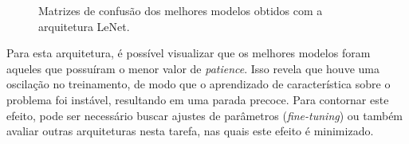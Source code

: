 \begin{figure}[h!]
	\centering
	\caption{Matrizes de confusão dos melhores modelos obtidos com a arquitetura LeNet.}\label{fig:matrizes-lenet}
	\hfill
\end{figure}



Para esta arquitetura, é possível visualizar que os melhores modelos foram aqueles que possuíram o menor valor de \emph{patience}. Isso revela que houve uma oscilação no treinamento, de modo que o aprendizado de característica sobre o problema foi instável, resultando em uma parada precoce. Para contornar este efeito, pode ser necessário buscar ajustes de parâmetros (\emph{fine-tuning}) ou também avaliar outras arquiteturas nesta tarefa, nas quais este efeito é minimizado.

